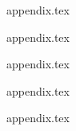 \newpage

\begin{appendices}


{appendix.tex}

{appendix.tex}

{appendix.tex}

{appendix.tex}

{appendix.tex}



\end{appendices}
% 